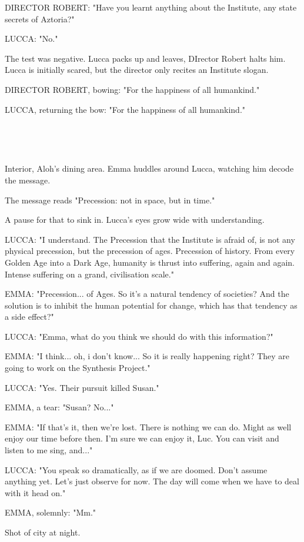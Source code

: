 \documentclass[11pt]{article}
\begin{document}
DIRECTOR ROBERT: "Have you learnt anything about the Institute, any state secrets of Aztoria?"

LUCCA: "No."

The test was negative.
Lucca packs up and leaves, DIrector Robert halts him.
Lucca is initially scared, but the director only recites an Institute slogan.

DIRECTOR ROBERT, bowing: "For the happiness of all humankind."

LUCCA, returning the bow: "For the happiness of all humankind."

\ 

\ 

Interior, Aloh's dining area. 
Emma huddles around Lucca, watching him decode the message.

The message reads "Precession: not in space, but in time."

A pause for that to sink in.
Lucca's eyes grow wide with understanding.

LUCCA: "I understand.
The Precession that the Institute is afraid of, is not any physical precession, but the precession of ages.
Precession of history.
From every Golden Age into a Dark Age, humanity is thrust into suffering, again and again.
Intense suffering on a grand, civilisation scale."

EMMA: "Precession... of Ages.
So it's a natural tendency of societies?
And the solution is to inhibit the human potential for change, which has that tendency as a side effect?"

LUCCA: "Emma, what do you think we should do with this information?"

EMMA: "I think... oh, i don't know...
So it is really happening right?
They are going to work on the Synthesis Project."

LUCCA: "Yes. Their pursuit killed Susan."

EMMA, a tear: "Susan? No..."

EMMA: "If that's it, then we're lost.
There is nothing we can do.
Might as well enjoy our time before then.
I'm sure we can enjoy it, Luc.
You can visit and listen to me sing, and..."

LUCCA: "You speak so dramatically, as if we are doomed.
Don't assume anything yet. 
Let's just observe for now.
The day will come when we have to deal with it head on."

EMMA, solemnly: "Mm."

Shot of city at night.
\end{document}
